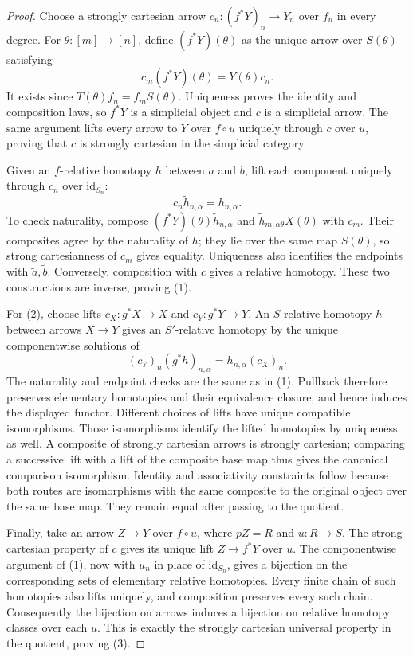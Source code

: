 \begin{proof}
Choose a strongly cartesian arrow $c_n:(f^*Y)_n\to Y_n$ over $f_n$
in every degree. For $\theta:[m]\to[n]$, define $(f^*Y)(\theta)$
as the unique arrow over $S(\theta)$ satisfying
$$
c_m(f^*Y)(\theta)=Y(\theta)c_n.
$$
It exists since $T(\theta)f_n=f_mS(\theta)$. Uniqueness proves the
identity and composition laws, so $f^*Y$ is a simplicial object and $c$
is a simplicial arrow. The same argument lifts every arrow to $Y$ over
$f\circ u$ uniquely through $c$ over $u$, proving that $c$ is strongly
cartesian in the simplicial category.

Given an $f$-relative homotopy $h$ between $a$ and $b$, lift each component
uniquely through $c_n$ over $\mathrm{id}_{S_n}$:
$$
c_n\widetilde h_{n,\alpha}=h_{n,\alpha}.
$$
To check naturality, compose
$(f^*Y)(\theta)\widetilde h_{n,\alpha}$ and
$\widetilde h_{m,\alpha\theta}X(\theta)$ with $c_m$.
Their composites agree by the naturality of $h$; they lie over the same
map $S(\theta)$, so strong cartesianness of $c_m$ gives equality.
Uniqueness also identifies the endpoints with $\widetilde a,\widetilde b$.
Conversely, composition with $c$ gives a relative homotopy. These two
constructions are inverse, proving (1).

For (2), choose lifts $c_X:g^*X\to X$ and $c_Y:g^*Y\to Y$.
An $S$-relative homotopy $h$ between arrows $X\to Y$ gives an
$S'$-relative homotopy by the unique componentwise solutions of
$$
(c_Y)_n(g^*h)_{n,\alpha}=h_{n,\alpha}(c_X)_n.
$$
The naturality and endpoint checks are the same as in (1). Pullback
therefore preserves elementary homotopies and their equivalence closure,
and hence induces the displayed functor. Different choices of lifts have
unique compatible isomorphisms. Those isomorphisms identify the lifted
homotopies by uniqueness as well. A composite of strongly cartesian
arrows is strongly cartesian; comparing a successive lift with a lift
of the composite base map thus gives the canonical comparison
isomorphism. Identity and associativity constraints follow because both
routes are isomorphisms with the same composite to the original object
over the same base map. They remain equal after passing to the quotient.

Finally, take an arrow $Z\to Y$ over $f\circ u$, where $pZ=R$ and
$u:R\to S$. The strong cartesian property of $c$ gives its unique lift
$Z\to f^*Y$ over $u$. The componentwise argument of (1), now with
$u_n$ in place of $\mathrm{id}_{S_n}$, gives a bijection on the
corresponding sets of elementary relative homotopies. Every finite chain
of such homotopies also lifts uniquely, and composition preserves every
such chain. Consequently the bijection on arrows induces a bijection on
relative homotopy classes over each $u$. This is exactly the strongly
cartesian universal property in the quotient, proving (3).
\end{proof}

